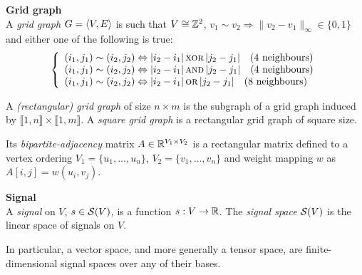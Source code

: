 \begin{definition}\textbf{Grid graph}\\
A \emph{grid graph} $G = \langle V, E \rangle$ is 
such that $V \cong \mathbb{Z}^2$, $v_1 \sim v_2 \Rightarrow \|v_2 -v_1\|_\infty \in \{0, 1\}$ and either one of the following is true:
\begin{gather*}
\left\{
  \begin{array}{l}
    (i_1,j_1) \sim (i_2,j_2) \Leftrightarrow |i_2 - i_1| \operatorname{\textsc{xor}} |j_2 - j_1| \quad \text{($4$ neighbours)}\\
    (i_1,j_1) \sim (i_2,j_2) \Leftrightarrow |i_2 - i_1| \operatorname{\textsc{and}} |j_2 - j_1| \quad \text{($4$ neighbours)}\\
    (i_1,j_1) \sim (i_2,j_2) \Leftrightarrow |i_2 - i_1| \operatorname{\textsc{or}} |j_2 - j_1| \quad \text{($8$ neighbours)}
  \end{array}
\right.
\end{gather*}

A \emph{(rectangular) grid graph} of size $n \times m$ is the subgraph of a grid graph induced by $\llbracket 1, n \rrbracket \times \llbracket 1, m \rrbracket$. A \emph{square grid graph} is a rectangular grid graph of square size.
\end{definition}


Its \emph{bipartite-adjacency} matrix $A \in \mathbb{R}^{V_1 \times V_2}$ is a rectangular matrix defined \wrt to a vertex ordering $V_1 = \{u_1, \ldots, u_n\}$, $V_2 = \{v_1, \ldots, v_n\}$ and weight mapping $w$ as $A[i,j] = w(u_i,v_j)$.

\begin{definition}\textbf{Signal}\\
A \emph{signal} on $V$, $s \in \mathcal{S}(V)$, is a function $s: V \rightarrow \mathbb{R}$.
The \emph{signal space} $\mathcal{S}(V)$ is the linear space of signals on $V$.
\end{definition}

\begin{remark}
In particular, a vector space, and more generally a tensor space, are finite-dimensional signal spaces over any of their bases.
\end{remark}

